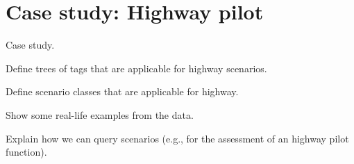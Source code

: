 \cbstart

\section{Case study: Highway pilot}
\label{sec:example}

\color{red}

Case study.

Define trees of tags that are applicable for highway scenarios.

Define scenario classes that are applicable for highway.

Show some real-life examples from the data.

Explain how we can query scenarios (e.g., for the assessment of an highway pilot function).


\color{black}

\cbend
